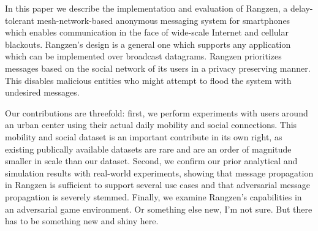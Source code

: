 In this paper we describe the implementation and evaluation of Rangzen, a
delay-tolerant mesh-network-based anonymous messaging system for smartphones
which enables communication in the face of wide-scale Internet and cellular
blackouts. Rangzen's design is a general one which supports any application
which can be implemented over broadcast datagrams. Rangzen prioritizes messages
based on the social network of its users in a privacy preserving manner. This
disables malicious entities who might attempt to flood the system with
undesired messages. 

Our contributions are threefold: first, we perform experiments with users
around an urban center using their actual daily mobility and social connections.
This mobility and social dataset is an important contribute in its own right,
as existing publically available datasets are rare and are an order of magnitude
smaller in scale than our dataset. Second, we confirm our prior analytical
and simulation results with real-world experiments, showing that message propagation
in Rangzen is sufficient to support several use cases and that adversarial message
propagation is severely stemmed. Finally, we examine Rangzen's capabilities in an
adversarial game environment. Or something else new, I'm not sure. But there has
to be something new and shiny here.

